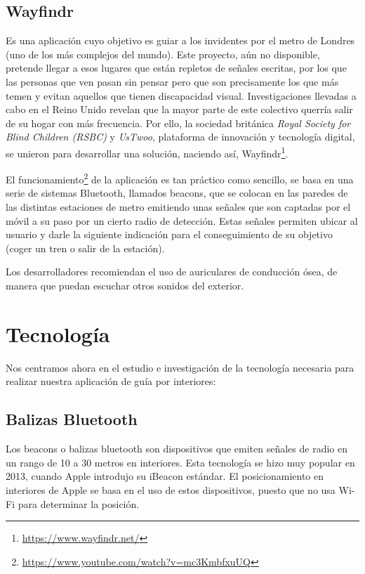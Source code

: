 \subsection{Wayfindr} %
Es una aplicación cuyo objetivo es guiar a los invidentes por el metro de Londres (uno de los más complejos del mundo). Este proyecto, aún no disponible, pretende llegar a esos lugares que están repletos de señales escritas, por los que las personas que ven pasan sin pensar pero que son precisamente los que más temen y evitan aquellos que tienen discapacidad visual. Investigaciones llevadas a cabo en el Reino Unido revelan que la mayor parte de este colectivo querría salir de su hogar con más frecuencia. Por ello, la sociedad británica \textit{Royal Society for Blind Children (RSBC)} y \textit{UsTwoo}, plataforma de innovación y tecnología digital, se unieron para desarrollar una solución, naciendo así, Wayfindr\footnote{\url{https://www.wayfindr.net/}}.

El funcionamiento\footnote{\url{https://www.youtube.com/watch?v=mc3KmbfxuUQ}} de la aplicación es tan práctico como sencillo, se basa en una serie de sistemas Bluetooth, llamados beacons, que se colocan en las paredes de las distintas estaciones de metro emitiendo unas señales que son captadas por el móvil a su paso por un cierto radio de detección. Estas señales permiten ubicar al usuario y darle la siguiente indicación para el conseguimiento de su objetivo (coger un tren o salir de la estación).

Los desarrolladores recomiendan el uso de auriculares de conducción ósea, de manera que puedan escuchar otros sonidos del exterior.

\section{Tecnología}
Nos centramos ahora en el estudio e investigación de la tecnología necesaria para realizar nuestra aplicación de guía por interiores:

\subsection{Balizas Bluetooth}

Los beacons o balizas bluetooth son dispositivos que emiten señales de radio en un rango de 10 a 30 metros en interiores. Esta tecnología se hizo muy popular en 2013, cuando Apple introdujo su iBeacon estándar. El posicionamiento en interiores de Apple se basa en el uso de estos dispositivos, puesto que no usa Wi-Fi para determinar la posición.

